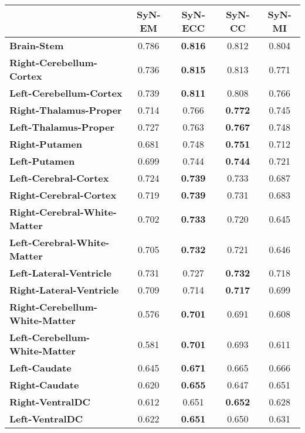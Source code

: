 \begin{table}[p]
\begin{adjustwidth}{-0.75cm}{}
  {\centering
    \small
    \begin{tabular}{lcccc}
    \toprule
    \textbf{}& \textbf{SyN-EM} & \textbf{SyN-ECC} & \textbf{SyN-CC} & \textbf{SyN-MI} \\
    \midrule
    \textbf{Brain-Stem} & 0.786 & \textbf{0.816} & 0.812 & 0.804 \\
    \textbf{Right-Cerebellum-Cortex} & 0.736 & \textbf{0.815} & 0.813 & 0.771 \\
    \textbf{Left-Cerebellum-Cortex} & 0.739 & \textbf{0.811} & 0.808 & 0.766 \\
    \textbf{Right-Thalamus-Proper} & 0.714 & 0.766 & \textbf{0.772} & 0.745 \\
    \textbf{Left-Thalamus-Proper} & 0.727 & 0.763 & \textbf{0.767} & 0.748 \\
    \textbf{Right-Putamen} & 0.681 & 0.748 & \textbf{0.751} & 0.712 \\
    \textbf{Left-Putamen} & 0.699 & 0.744 & \textbf{0.744} & 0.721 \\
    \textbf{Left-Cerebral-Cortex} & 0.724 & \textbf{0.739} & 0.733 & 0.687 \\
    \textbf{Right-Cerebral-Cortex} & 0.719 & \textbf{0.739} & 0.731 & 0.683 \\
    \textbf{Right-Cerebral-White-Matter} & 0.702 & \textbf{0.733} & 0.720 & 0.645 \\
    \textbf{Left-Cerebral-White-Matter} & 0.705 & \textbf{0.732} & 0.721 & 0.646 \\
    \textbf{Left-Lateral-Ventricle} & 0.731 & 0.727 & \textbf{0.732} & 0.718 \\
    \textbf{Right-Lateral-Ventricle} & 0.709 & 0.714 & \textbf{0.717} & 0.699 \\
    \textbf{Right-Cerebellum-White-Matter} & 0.576 & \textbf{0.701} & 0.691 & 0.608 \\
    \textbf{Left-Cerebellum-White-Matter} & 0.581 & \textbf{0.701} & 0.693 & 0.611 \\
    \textbf{Left-Caudate} & 0.645 & \textbf{0.671} & 0.665 & 0.666 \\
    \textbf{Right-Caudate} & 0.620 & \textbf{0.655} & 0.647 & 0.651 \\
    \textbf{Right-VentralDC} & 0.612 & 0.651 & \textbf{0.652} & 0.628 \\
    \textbf{Left-VentralDC} & 0.622 & \textbf{0.651} & 0.650 & 0.631 \\

\end{tabular}}
\end{adjustwidth}
\end{table}
